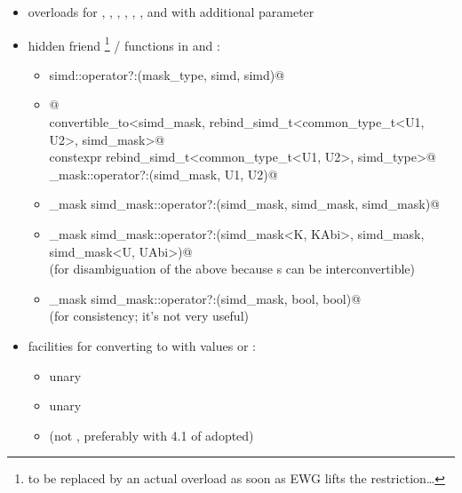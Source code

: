 \begin{itemize}
  \item overloads for ,
    ,
    ,
    , ,
    , and  with additional  parameter

  \item hidden friend \footnote{to be replaced by an actual
     overload as soon as EWG lifts the restriction\ldots} /
     functions in  and :
    \begin{itemize}
      \item \lstinline@simd simd::operator?:(mask_type, simd, simd)@
      \item {}@\\
        \lstinline@requires convertible_to<simd_mask, rebind_simd_t<common_type_t<U1, U2>, simd_mask>@\\
        \lstinline@friend constexpr rebind_simd_t<common_type_t<U1, U2>, simd_type>@\\
        \lstinline@simd_mask::operator?:(simd_mask, U1, U2)@
      \item \lstinline@simd_mask simd_mask::operator?:(simd_mask, simd_mask, simd_mask)@
      \item \lstinline@simd_mask simd_mask::operator?:(simd_mask<K, KAbi>, simd_mask, simd_mask<U, UAbi>)@\\
        (for disambiguation of the above because s can be interconvertible)
      \item \lstinline@simd_mask simd_mask::operator?:(simd_mask, bool, bool)@\\
        (for consistency; it's not very useful)
    \end{itemize}

  \item facilities for converting  to  with
    values  or :
    \begin{itemize}
      \item unary 
      \item unary 
      \item {} (not ,
        preferably with 4.1 of \cite{P2600R0} adopted)
    \end{itemize}
\end{itemize}

